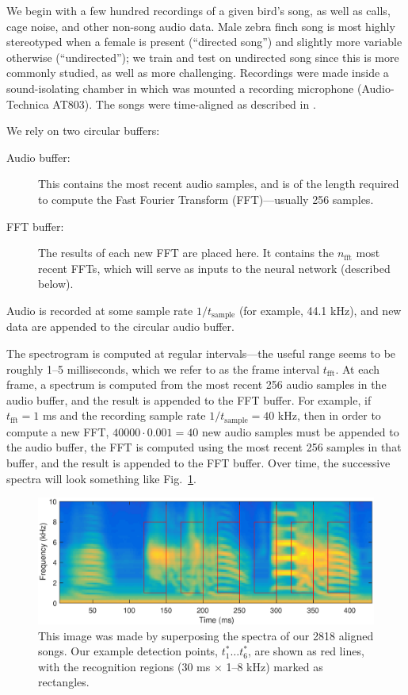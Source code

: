 \documentclass[10pt,letterpaper]{article}
\newcommand\fig[1]{Fig.~\ref{#1}}
\begin{document}
We begin with a few hundred recordings of a given bird's song, as well as calls, cage noise, and other non-song audio data.  Male
zebra finch song is most highly stereotyped when a female is present
(``directed song'') and slightly more variable otherwise
(``undirected''); we train and test on undirected song since this is
more commonly studied, as well as more challenging.  Recordings were made inside a sound-isolating
chamber in which was mounted a recording microphone (Audio-Technica
AT803).  The songs were time-aligned as described in \cite{Poole2012}.

We rely on two circular buffers:
\begin{description}
\item[Audio buffer:] This contains the most recent audio samples, and
  is of the length required to compute the Fast Fourier Transform
  (FFT)---usually 256 samples.
\item[FFT buffer:] The results of each new FFT are placed here.  It
  contains the $n_\textrm{fft}$ most recent FFTs, which will serve as
  inputs to the neural network (described below).
\end{description}

Audio is recorded at some sample rate $1/t_\mathrm{sample}$ (for example, 44.1 kHz), and new data are appended to the circular audio buffer.

The spectrogram is computed at regular intervals---the useful range
seems to be roughly 1--5 milliseconds, which we refer to as the frame
interval $t_\textrm{fft}$.  At each frame, a spectrum is computed from
the most recent 256 audio samples in the audio buffer, and the result
is appended to the FFT buffer.  For example, if $t_\textrm{fft}=1$ ms
and the recording sample rate $1/t_\textrm{sample}=40$ kHz, then in
order to compute a new FFT, $40000\cdot 0.001=40$ new audio samples
must be appended to the audio buffer, the FFT is computed using the
most recent 256 samples in that buffer, and the result is appended to
the FFT buffer.  Over time, the successive spectra will look something
like \fig{fig:song}.

\begin{figure}
  \includegraphics[width=\textwidth]{Fig1}
  \caption{This image was made by superposing the spectra of our 2818
    aligned songs.  Our example detection points, $t^*_1\ldots t^*_6$,
    are shown as red lines, with the recognition regions (30 ms
    $\times$ 1--8 kHz) marked as rectangles.}
  \label{fig:song}
\end{figure}
\end{document}
